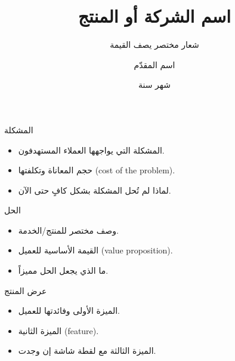 \documentclass[aspectratio=169,11pt]{beamer}
\title{اسم الشركة أو المنتج}
\subtitle{شعار مختصر يصف القيمة}
\author{اسم المقدّم}
\institute{الشركة}
\date{شهر سنة}
\let\textEN\textenglish
\begin{document}
\begin{frame}[plain]
\titlepage
\end{frame}

\begin{frame}{المشكلة}
\begin{itemize}
  \item المشكلة التي يواجهها العملاء المستهدفون.
  \item حجم المعاناة وتكلفتها \textEN{(cost of the problem)}.
  \item لماذا لم تُحل المشكلة بشكل كافٍ حتى الآن.
\end{itemize}
\end{frame}

\begin{frame}{الحل}
\begin{itemize}
  \item وصف مختصر للمنتج/الخدمة.
  \item القيمة الأساسية للعميل \textEN{(value proposition)}.
  \item ما الذي يجعل الحل مميزاً.
\end{itemize}
\end{frame}

\begin{frame}{عرض المنتج}
\begin{itemize}
  \item الميزة الأولى وفائدتها للعميل.
  \item الميزة الثانية \textEN{(feature)}.
  \item الميزة الثالثة مع لقطة شاشة إن وجدت.
\end{itemize}
\end{frame}
\end{document}
